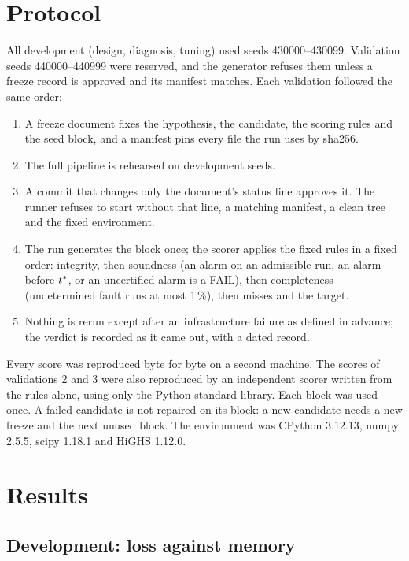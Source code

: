 \section{Protocol}\label{sec:protocol}

All development (design, diagnosis, tuning) used seeds 430000--430099. Validation seeds 440000--440999 were reserved,
and the generator refuses them unless a freeze record is approved and its manifest matches. Each validation followed
the same order:
\begin{enumerate}
\item A freeze document fixes the hypothesis, the candidate, the scoring rules and the seed block, and a manifest pins
  every file the run uses by sha256.
\item The full pipeline is rehearsed on development seeds.
\item A commit that changes only the document's status line approves it. The runner refuses to start without that
  line, a matching manifest, a clean tree and the fixed environment.
\item The run generates the block once; the scorer applies the fixed rules in a fixed order: integrity, then soundness
  (an alarm on an admissible run, an alarm before $t^{\ast}$, or an uncertified alarm is a FAIL), then completeness
  (undetermined fault runs at most 1\,\%), then misses and the target.
\item Nothing is rerun except after an infrastructure failure as defined in advance; the verdict is recorded as it
  came out, with a dated record.
\end{enumerate}
Every score was reproduced byte for byte on a second machine. The scores of validations 2 and 3 were also reproduced by
an independent scorer written from the rules alone, using only the Python standard library. Each block was used once. A failed candidate is not repaired on its
block: a new candidate needs a new freeze and the next unused block. The environment was CPython 3.12.13, numpy 2.5.5,
scipy 1.18.1 and HiGHS 1.12.0.

\section{Results}

\subsection{Development: loss against memory}

